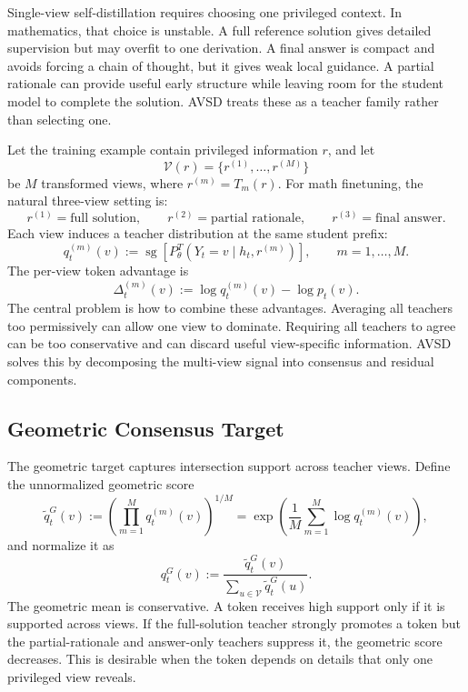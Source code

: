 Single-view self-distillation requires choosing one privileged context. In mathematics, that choice is unstable. A full reference solution gives detailed supervision but may overfit to one derivation. A final answer is compact and avoids forcing a chain of thought, but it gives weak local guidance. A partial rationale can provide useful early structure while leaving room for the student model to complete the solution. AVSD treats these as a teacher family rather than selecting one.

Let the training example contain privileged information $r$, and let
\[
    \mathcal{V}(r)=\{r^{(1)},\ldots,r^{(M)}\}
\]
be $M$ transformed views, where $r^{(m)}=T_m(r)$. For math finetuning, the natural three-view setting is:
\[
    r^{(1)}=\text{full solution}, \qquad
    r^{(2)}=\text{partial rationale}, \qquad
    r^{(3)}=\text{final answer}.
\]
Each view induces a teacher distribution at the same student prefix:
\[
    q_t^{(m)}(v)
    := \operatorname{sg}\left[P_{\theta}^{T}(Y_t=v\mid h_t,r^{(m)})\right],
    \qquad m=1,\ldots,M.
\]
The per-view token advantage is
\[
    \Delta_t^{(m)}(v)
    := \log q_t^{(m)}(v)-\log p_t(v).
\]
The central problem is how to combine these advantages. Averaging all teachers too permissively can allow one view to dominate. Requiring all teachers to agree can be too conservative and can discard useful view-specific information. AVSD solves this by decomposing the multi-view signal into consensus and residual components.

\subsection{Geometric Consensus Target}

The geometric target captures intersection support across teacher views. Define the unnormalized geometric score
\[
    \widetilde{q}_t^G(v)
    := \left(\prod_{m=1}^{M}q_t^{(m)}(v)\right)^{1/M}
    = \exp\left(\frac{1}{M}\sum_{m=1}^{M}\log q_t^{(m)}(v)\right),
\]
and normalize it as
\[
    q_t^G(v)
    := \frac{\widetilde{q}_t^G(v)}
    {\sum_{u\in\mathcal{V}}\widetilde{q}_t^G(u)}.
\]
The geometric mean is conservative. A token receives high support only if it is supported across views. If the full-solution teacher strongly promotes a token but the partial-rationale and answer-only teachers suppress it, the geometric score decreases. This is desirable when the token depends on details that only one privileged view reveals.

